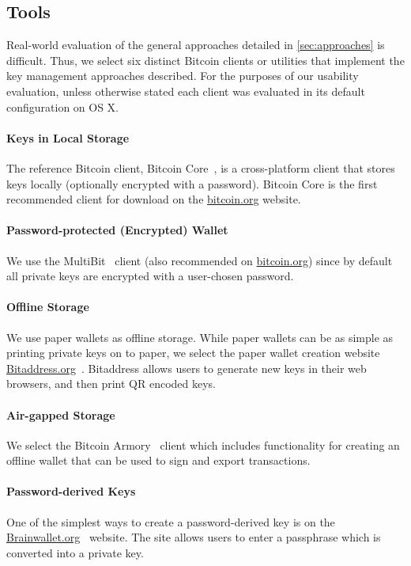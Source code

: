 \subsection{Tools}
Real-world evaluation of the general approaches detailed in \autoref{sec:approaches} is difficult. Thus, we select six distinct Bitcoin clients or utilities that implement the key management approaches described. For the purposes of our usability evaluation, unless otherwise stated each client was evaluated in its default configuration on OS X. 

\paragraph{Keys in Local Storage} The reference Bitcoin client, Bitcoin Core~\cite{bitcoinqt}, is a cross-platform client that stores keys locally (optionally encrypted with a password). Bitcoin Core is the first recommended client for download on the \url{bitcoin.org} website. 

\paragraph{Password-protected (Encrypted) Wallet} We use the MultiBit~\cite{multibit} client (also recommended on \url{bitcoin.org}) since by default all private keys are encrypted with a user-chosen password. 

\paragraph{Offline Storage} We use paper wallets as offline storage. While paper wallets can be as simple as printing private keys on to paper, we select the paper wallet creation website \url{Bitaddress.org}~\cite{bitaddress}. Bitaddress allows users to generate new keys in their web browsers, and then print QR encoded keys. 

\paragraph{Air-gapped Storage} We select the Bitcoin Armory~\cite{bitcoinarmory} client which includes functionality for creating an offline wallet that can be used to sign and export transactions. 

\paragraph{Password-derived Keys} One of the simplest ways to create a password-derived key is on the \url{Brainwallet.org}~\cite{brainwallet} website. The site allows users to enter a passphrase which is converted into a private key. 

